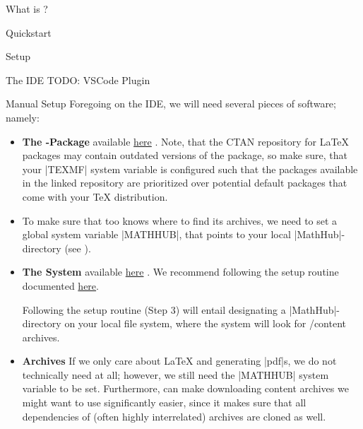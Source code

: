 \begin{sfragment}{What is \sTeX?}
\end{sfragment}

\begin{sfragment}{Quickstart}

	\begin{sfragment}{Setup}
		\begin{sfragment}{The \sTeX IDE}
      TODO: VSCode Plugin
    \end{sfragment}
    \begin{sfragment}{Manual Setup}
      Foregoing on the \sTeX IDE, we will need several
      pieces of software; namely:
      \begin{itemize}
        \item \textbf{The \sTeX-Package} available 
          \href{https://github.com/slatex/sTeX/blob/latex3/doc/stex.pdf}{here}%
          .
          Note, that the CTAN repository for \LaTeX{} packages
          may contain outdated versions of the \sTeX package, so
          make sure, that your |TEXMF| system variable is configured such
          that the packages available in the linked repository are prioritized
          over potential default packages that come with your \TeX{} distribution.

        \item To make sure that \sTeX too knows where to find its
          archives, we need to set a global system variable |MATHHUB|,
          that points to your local |MathHub|-directory 
          (see ).

        \item \textbf{The \mmt System} available
          \href{https://github.com/uniformal/MMT/tree/sTeX}{here}%
          . We recommend following
          the setup routine documented 
          \href{https://uniformal.github.io//doc/setup/}{here}.

          Following the setup routine (Step 3) will entail designating
          a |MathHub|-directory on your local file system, where
          the \mmt system will look for \sTeX/\mmt content archives.

        \item \textbf{\sTeX Archives} If we only care about {\LaTeX} and generating |pdf|s, we do not
          technically need \mmt at all; however, we still need the |MATHHUB|
          system variable to be set. Furthermore, \mmt can make downloading
          content archives we might want to use significantly easier, since
          it makes sure that all dependencies of (often highly interrelated)
          \sTeX archives are cloned as well.


\end{itemize}
\end{sfragment}
\end{sfragment}
\end{sfragment}
